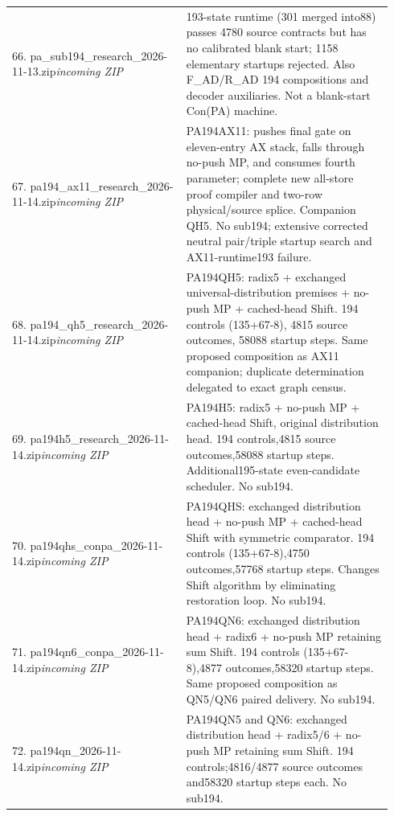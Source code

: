 \begin{longtable}{@{}p{0.43\linewidth}p{0.51\linewidth}@{}}
66. pa\_\allowbreak{}sub194\_\allowbreak{}research\_\allowbreak{}2026-11-13.zip\newline\emph{incoming ZIP} & 193-state runtime (301 merged into88) passes 4780 source contracts but has no calibrated blank start; 1158 elementary startups rejected. Also F\_\allowbreak{}AD/R\_\allowbreak{}AD 194 compositions and decoder auxiliaries. Not a blank-start Con(PA) machine.\\[5pt]
67. pa194\_\allowbreak{}ax11\_\allowbreak{}research\_\allowbreak{}2026-11-14.zip\newline\emph{incoming ZIP} & PA194AX11: pushes final gate on eleven-entry AX stack, falls through no-push MP, and consumes fourth parameter; complete new all-store proof compiler and two-row physical/source splice. Companion QH5. No sub194; extensive corrected neutral pair/triple startup search and AX11-runtime193 failure.\\[5pt]
68. pa194\_\allowbreak{}qh5\_\allowbreak{}research\_\allowbreak{}2026-11-14.zip\newline\emph{incoming ZIP} & PA194QH5: radix5 + exchanged universal-distribution premises + no-push MP + cached-head Shift. 194 controls (135+67-8), 4815 source outcomes, 58088 startup steps. Same proposed composition as AX11 companion; duplicate determination delegated to exact graph census.\\[5pt]
69. pa194h5\_\allowbreak{}research\_\allowbreak{}2026-11-14.zip\newline\emph{incoming ZIP} & PA194H5: radix5 + no-push MP + cached-head Shift, original distribution head. 194 controls,4815 source outcomes,58088 startup steps. Additional195-state even-candidate scheduler. No sub194.\\[5pt]
70. pa194qhs\_\allowbreak{}conpa\_\allowbreak{}2026-11-14.zip\newline\emph{incoming ZIP} & PA194QHS: exchanged distribution head + no-push MP + cached-head Shift with symmetric comparator. 194 controls (135+67-8),4750 outcomes,57768 startup steps. Changes Shift algorithm by eliminating restoration loop. No sub194.\\[5pt]
71. pa194qn6\_\allowbreak{}conpa\_\allowbreak{}2026-11-14.zip\newline\emph{incoming ZIP} & PA194QN6: exchanged distribution head + radix6 + no-push MP retaining sum Shift. 194 controls (135+67-8),4877 outcomes,58320 startup steps. Same proposed composition as QN5/QN6 paired delivery. No sub194.\\[5pt]
72. pa194qn\_\allowbreak{}2026-11-14.zip\newline\emph{incoming ZIP} & PA194QN5 and QN6: exchanged distribution head + radix5/6 + no-push MP retaining sum Shift. 194 controls;4816/4877 source outcomes and58320 startup steps each. No sub194.\\[5pt]
\bottomrule\end{longtable}
\endgroup
